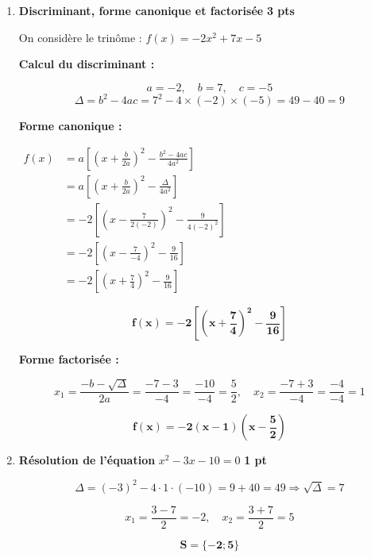 \documentclass[12pt,a4paper]{article}
\begin{document}
\begin{enumerate}
    \item \textbf{Discriminant, forme canonique et factorisée} \hfill \textbf{3 pts}

    On considère le trinôme : \( f(x) = -2x^2 + 7x - 5 \)

    \textbf{Calcul du discriminant :}

    \[
    a = -2,\quad b = 7,\quad c = -5
    \]
    \[
    \Delta = b^2 - 4ac = 7^2 - 4 \times (-2) \times (-5) = 49 - 40 = 9
    \]

    \textbf{Forme canonique :}
    
    $
\begin{aligned}
    f(x)&= a \left[ \left(x + \frac{b}{2a}\right)^2 - \frac{b^{2}-4ac}{4a^{2}}\right]\\
    		&= a \left[ \left(x + \frac{b}{2a}\right)^2 - \frac{\Delta}{4a^{2}}\right]\\
        &= -2\left[ \left( x - \frac{7}{2(-2)} \right)^2 - \frac{9}{4(-2)^{2}} \right]\\
        &=-2\left[ \left( x - \frac{7}{-4} \right)^2 - \frac{9}{16} \right]\\
        &=-2\left[ \left( x + \frac{7}{4} \right)^2 - \frac{9}{16} \right]
\end{aligned}
$

    \begin{resultbox}
    \[
    \mathbf{f(x)=-2\left[ \left( x + \frac{7}{4} \right)^2 - \frac{9}{16} \right]}
    \]
		\end{resultbox}

    \textbf{Forme factorisée :}

    \[
    x_1 = \frac{-b - \sqrt{\Delta}}{2a} = \frac{-7 - 3}{-4} = \frac{-10}{-4} = \frac{5}{2}, \quad
    x_2 = \frac{-7 + 3}{-4} = \frac{-4}{-4} = 1
    \]
    
    \begin{resultbox}
    \[
    \mathbf{f(x) = -2(x - 1)\left(x - \frac{5}{2}\right)}
    \]
		\end{resultbox}

    \item \textbf{Résolution de l’équation} \( x^2 - 3x - 10 = 0 \) \hfill \textbf{1 pt}

    \[
    \Delta = (-3)^2 - 4 \cdot 1 \cdot (-10) = 9 + 40 = 49
    \Rightarrow \sqrt{\Delta} = 7
    \]

    \[
    x_1 = \frac{3 - 7}{2} = -2, \quad x_2 = \frac{3 + 7}{2} = 5
    \]
		
    \begin{resultbox}
    \[
    \mathbf{S=\{-2 ; 5\}}
    \]
		\end{resultbox}


\end{enumerate}
\end{document}
